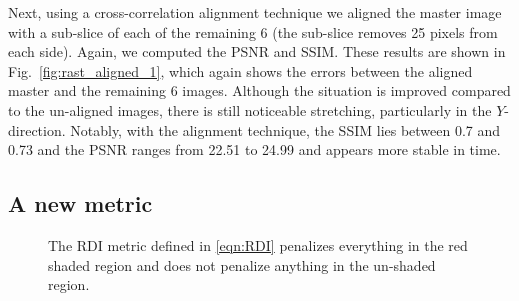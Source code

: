 \documentclass[twocolumn,oneside]{IEEEtran/IEEEtran}
\begin{document}
Next, using a cross-correlation alignment technique
we aligned the master image with a sub-slice of each of
the remaining 6 (the sub-slice removes 25 pixels from each side). Again, we
computed the PSNR and SSIM. These results are shown in
Fig.~\ref{fig:rast_aligned_1}, which again shows the errors between the
aligned master and the remaining 6 images. Although the situation is improved
compared to the un-aligned images, there is still noticeable stretching,
particularly in the $Y$-direction. Notably, with the alignment technique,
the SSIM lies between 0.7 and 0.73 and the PSNR ranges from 22.51 to 24.99 and appears more stable in time.






\subsection{A new metric}
\begin{figure}[t!]
  \centering
  
  \caption{The RDI metric defined in \eqref{eqn:RDI} penalizes everything in the
    red shaded region and does not penalize anything in the un-shaded region.}
  \label{fig:damage_illustrate}
\end{figure}
\end{document}
